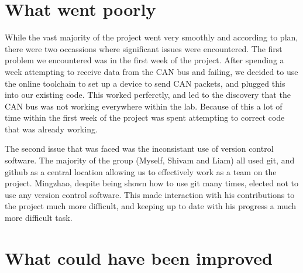 \section{What went poorly}

While the vast majority of the project went very smoothly and according to plan, 
there were two occassions where significant issues were encountered. The first 
problem we encountered was in the first week of the project. After spending a 
week attempting to receive data from the CAN bus and failing, we decided to use 
the online toolchain to set up a device to send CAN packets, and plugged this 
into our existing code. This worked perferctly, and led to the discovery that 
the CAN bus was not working everywhere within the lab. Because of this a lot of 
time within the first week of the project was spent attempting to correct code 
that was already working. 
\par\bigskip\noindent
The second issue that was faced was the inconsistant use of version control 
software. The majority of the group (Myself, Shivam and Liam) all used git, and 
github as a central location allowing us to effectively work as a team on the 
project. Mingzhao, despite being shown how to use git many times, elected not 
to use any version control software. This made interaction with his contributions
to the project much more difficult, and keeping up to date with his progress a 
much more difficult task. 

\section{What could have been improved}

